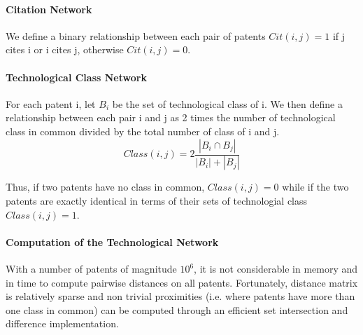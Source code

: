 \paragraph{Citation Network}

We define a binary relationship between each pair of patents $Cit(i, j) = 1$ if j cites i or i cites j, otherwise $Cit(i, j) = 0$. 

\paragraph{Technological Class Network}

For each patent i, let $B_i$ be the set of technological class of i. We then define a relationship between each pair i and j as 2 times the number of technological class in common divided by the total number of class of i and j. 
\[
Class(i,j) = 2\frac{\left\vert{B_i\cap B_j}\right\vert}{\left\vert{B_i}\right\vert+\left\vert{B_j}\right\vert}
\]

Thus, if two patents have no class in common, $Class(i,j)=0$ while if the two patents are exactly identical in terms of their sets of technologial class $Class(i,j)=1$.


\paragraph{Computation of the Technological Network}

With a number of patents of magnitude $10^6$, it is not considerable in memory and in time to compute pairwise distances on all patents. Fortunately, distance matrix is relatively sparse and non trivial proximities  (i.e. where patents have more than one class in common) can be computed through an efficient set intersection and difference implementation.

